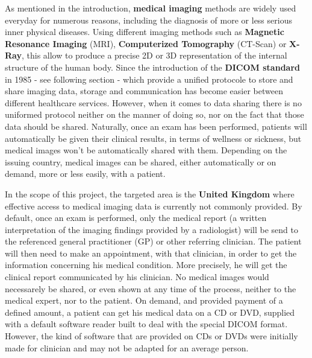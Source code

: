 As mentioned in the introduction, \textbf{medical imaging} methods are widely used everyday for numerous reasons, including the diagnosis of more or less serious inner physical diseases. Using different imaging methods such as \textbf{Magnetic Resonance Imaging} (MRI), \textbf{Computerized Tomography} (CT-Scan) or \textbf{X-Ray}, this allow to produce a precise 2D or 3D representation of the internal structure of the human body. Since the introduction of the \textbf{DICOM standard} in 1985 - see following section - which provide a unified protocole to store and share imaging data, storage and communication has become easier between different healthcare services. However, when it comes to data sharing there is no uniformed protocol neither on the manner of doing so, nor on the fact that those data should be shared. Naturally, once an exam has been performed, patients will automatically be given their clinical results, in terms of wellness or sickness, but medical images won't be automatically shared with them. Depending on the issuing country, medical images can be shared, either automatically or on demand, more or less easily, with a patient.

\newline \vspace{5mm}

In the scope of this project, the targeted area is the \textbf{United Kingdom} where effective access to medical imaging data is currently not commonly provided. By default, once an exam is performed, only the medical report (a written interpretation of the imaging findings provided by a radiologist) will be send to the referenced general practitioner (GP) or other referring clinician. The patient will then need to make an appointment, with that clinician, in order to get the information concerning his medical condition. More precisely, he will get the clinical report communicated by his clinician. No medical images would necessarely be shared, or even shown at any time of the process, neither to the medical expert, nor to the patient. On demand, and provided payment of a defined amount, a patient can get his medical data on a CD or DVD, supplied with a default software reader built to deal with the special DICOM format. However, the kind of software that are provided on CDs or DVDs were initially made for clinician and may not be adapted for an average person. 


